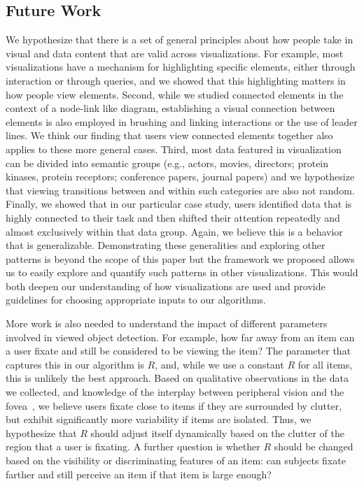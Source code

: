 \subsection{Future Work}
\label{sec:FutureWork}
We hypothesize that there is a set of general principles about how people take in visual and data content that are valid across visualizations. For example, most visualizations have a mechanism for highlighting specific elements, either through interaction or through queries, and we showed that this highlighting matters in how people view elements. Second, while we studied connected elements in the context of a node-link like diagram, establishing a visual connection between elements is also employed in brushing and linking interactions or the use of leader lines. We think our finding that users view connected elements together also applies to these more general cases. Third, most data featured in visualization can be divided into semantic groups (e.g., actors, movies, directors; protein kinases, protein receptors; conference papers, journal papers) and we hypothesize that viewing transitions between and within such categories are also not random. Finally, we showed that in our particular case study, users identified data that is highly connected to their task and then shifted their attention repeatedly and almost exclusively within that data group. Again, we believe this is a behavior that is generalizable. Demonstrating these generalities and exploring other patterns is beyond the scope of this paper but the framework we proposed allows us to easily explore and quantify such patterns in other visualizations. This would both deepen our understanding of how visualizations are used and provide guidelines for choosing appropriate inputs to our algorithms. 

More work is also needed to understand the impact of different parameters involved in viewed object detection. For example, how far away from an item can a user fixate and still be considered to be viewing the item? The parameter that captures this in our algorithm is $R$, and, while we use a constant $R$ for all items, this is unlikely the best approach. Based on qualitative observations in the data we collected,  and knowledge of the interplay between peripheral vision and the fovea~\cite{balas2009summary}, we believe users fixate close to items if they are surrounded by clutter,  but exhibit significantly more variability if items are isolated. Thus, we hypothesize that $R$ should adjust itself dynamically based on the clutter of the region that a user is fixating.  A further question is whether $R$ should be changed based on the visibility or discriminating features of an item: can subjects fixate farther and still perceive an item if that item is large enough?

